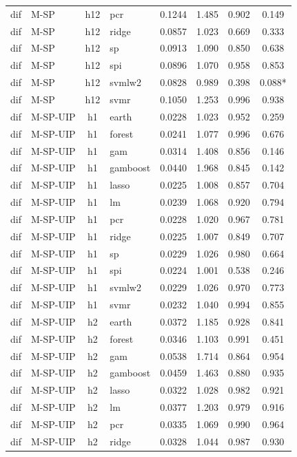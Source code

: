 \begin{ThreePartTable}
\begin{longtable}[t]{llclcccc}
dif & M-SP & h12 & pcr & 0.1244 & 1.485 & 0.902 & 0.149\\
dif & M-SP & h12 & ridge & 0.0857 & 1.023 & 0.669 & 0.333\\
dif & M-SP & h12 & sp & 0.0913 & 1.090 & 0.850 & 0.638\\
dif & M-SP & h12 & spi & 0.0896 & 1.070 & 0.958 & 0.853\\
dif & M-SP & h12 & svmlw2 & 0.0828 & 0.989 & 0.398 & 0.088*\\
dif & M-SP & h12 & svmr & 0.1050 & 1.253 & 0.996 & 0.938\\
\addlinespace
dif & M-SP-UIP & h1 & earth & 0.0228 & 1.023 & 0.952 & 0.259\\
dif & M-SP-UIP & h1 & forest & 0.0241 & 1.077 & 0.996 & 0.676\\
dif & M-SP-UIP & h1 & gam & 0.0314 & 1.408 & 0.856 & 0.146\\
dif & M-SP-UIP & h1 & gamboost & 0.0440 & 1.968 & 0.845 & 0.142\\
dif & M-SP-UIP & h1 & lasso & 0.0225 & 1.008 & 0.857 & 0.704\\
dif & M-SP-UIP & h1 & lm & 0.0239 & 1.068 & 0.920 & 0.794\\
dif & M-SP-UIP & h1 & pcr & 0.0228 & 1.020 & 0.967 & 0.781\\
dif & M-SP-UIP & h1 & ridge & 0.0225 & 1.007 & 0.849 & 0.707\\
dif & M-SP-UIP & h1 & sp & 0.0229 & 1.026 & 0.980 & 0.664\\
dif & M-SP-UIP & h1 & spi & 0.0224 & 1.001 & 0.538 & 0.246\\
dif & M-SP-UIP & h1 & svmlw2 & 0.0229 & 1.026 & 0.970 & 0.773\\
dif & M-SP-UIP & h1 & svmr & 0.0232 & 1.040 & 0.994 & 0.855\\
\addlinespace
dif & M-SP-UIP & h2 & earth & 0.0372 & 1.185 & 0.928 & 0.841\\
dif & M-SP-UIP & h2 & forest & 0.0346 & 1.103 & 0.991 & 0.451\\
dif & M-SP-UIP & h2 & gam & 0.0538 & 1.714 & 0.864 & 0.954\\
dif & M-SP-UIP & h2 & gamboost & 0.0459 & 1.463 & 0.880 & 0.935\\
dif & M-SP-UIP & h2 & lasso & 0.0322 & 1.028 & 0.982 & 0.921\\
dif & M-SP-UIP & h2 & lm & 0.0377 & 1.203 & 0.979 & 0.916\\
dif & M-SP-UIP & h2 & pcr & 0.0335 & 1.069 & 0.990 & 0.964\\
dif & M-SP-UIP & h2 & ridge & 0.0328 & 1.044 & 0.987 & 0.930\\

\end{longtable}
\end{ThreePartTable}
